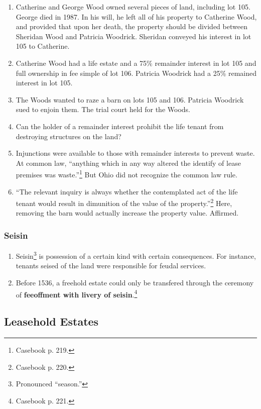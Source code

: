 \begin{enumerate}
    \item Catherine and George Wood owned several pieces of land, including 
    lot 105. George died in 1987. In his will, he left all of his property to 
    Catherine Wood, and provided that upon her death, the property should be 
    divided between Sheridan Wood and Patricia Woodrick. Sheridan conveyed his 
    interest in lot 105 to Catherine.
    \item Catherine Wood had a life estate and a 75\% remainder interest in 
    lot 105 and full ownership in fee simple of lot 106. Patricia Woodrick had 
    a 25\% remained interest in lot 105.
    \item The Woods wanted to raze a barn on lots 105 and 106. Patricia 
    Woodrick sued to enjoin them. The trial court held for the Woods.
    \item Can the holder of a remainder interest prohibit the life tenant from 
    destroying structures on the land?
    \item Injunctions were available to those with remainder 
    interests to prevent waste. At common law, ``anything which in any way 
    altered the identify of lease premises was waste.''\footnote{Casebook p. 
    219.} But Ohio did not recognize the common law rule.
    \item ``The relevant inquiry is always whether the contemplated act of the 
    life tenant would result in dimunition of the value of the 
    property.''\footnote{Casebook p. 220.} Here, removing the barn would 
    actually increase the property value. Affirmed.
\end{enumerate}

\subsubsection{Seisin}

\begin{enumerate}
    \item Seisin\footnote{Pronounced ``season.''} is possession of a certain kind with certain consequences. 
    For instance, tenants seised of the land were responsible for feudal 
    services.
    \item Before 1536, a freehold estate could only be transfered through the 
    ceremony of \textbf{feeoffment with livery of seisin}.\footnote{Casebook 
    p. 221.}
\end{enumerate}

\subsection{Leasehold Estates}

